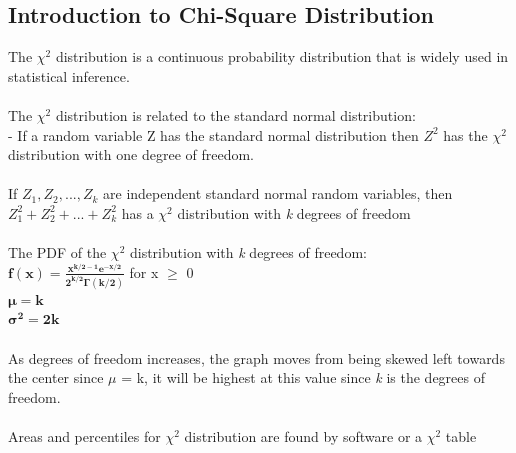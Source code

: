 \documentclass[12pt, a4paper]{article}
\begin{document}
	\subsection{Introduction to Chi-Square Distribution}
	The $\chi^2$ distribution is a continuous probability distribution that is widely used in statistical inference. \\~\\
	The $\chi^2$ distribution is related to the standard normal distribution: \\
	- If a random variable Z has the standard normal distribution then $Z^2$ has the $\chi^2$ distribution with one degree of freedom. \\~\\
	If $Z_1, Z_2, ..., Z_k$ are independent standard normal random variables, then \\
	$Z_1^2 + Z_2^2 + ...+ Z_k^2$ has a $\chi^2$ distribution with \textit{k} degrees of freedom \\~\\
	The PDF of the $\chi^2$ distribution with \textit{k} degrees of freedom: \\
	\large $\mathbf{f(x) = \frac{x^{k/2-1}e^{-x/2}}{2^{k/2}\Gamma(k/2)}}$ \normalsize for x $\geq$ 0 \\
	$\mathbf{\mu = k}$ \\
	$\mathbf{\sigma^2 = 2k}$ \\~\\
	As degrees of freedom increases, the graph moves from being skewed left towards the center since $\mu$ = k, it will be highest at this value since \textit{k} is the degrees of freedom. \\~\\
	Areas and percentiles for $\chi^2$ distribution are found by software or a $\chi^2$ table \\~\\
	
\end{document}
